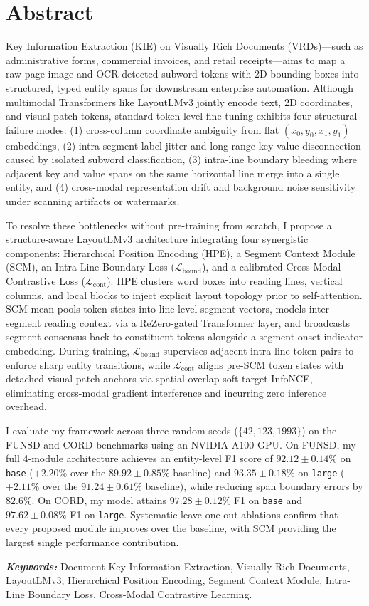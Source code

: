 \chapter*{Abstract}

Key Information Extraction (KIE) on Visually Rich Documents (VRDs)—such as administrative forms, commercial invoices, and retail receipts—aims to map a raw page image and OCR-detected subword tokens with 2D bounding boxes into structured, typed entity spans for downstream enterprise automation. Although multimodal Transformers like LayoutLMv3 jointly encode text, 2D coordinates, and visual patch tokens, standard token-level fine-tuning exhibits four structural failure modes: (1) cross-column coordinate ambiguity from flat $(x_0, y_0, x_1, y_1)$ embeddings, (2) intra-segment label jitter and long-range key-value disconnection caused by isolated subword classification, (3) intra-line boundary bleeding where adjacent key and value spans on the same horizontal line merge into a single entity, and (4) cross-modal representation drift and background noise sensitivity under scanning artifacts or watermarks.

To resolve these bottlenecks without pre-training from scratch, I propose a structure-aware LayoutLMv3 architecture integrating four synergistic components: Hierarchical Position Encoding (HPE), a Segment Context Module (SCM), an Intra-Line Boundary Loss ($\mathcal{L}_{\text{bound}}$), and a calibrated Cross-Modal Contrastive Loss ($\mathcal{L}_{\text{cont}}$). HPE clusters word boxes into reading lines, vertical columns, and local blocks to inject explicit layout topology prior to self-attention. SCM mean-pools token states into line-level segment vectors, models inter-segment reading context via a ReZero-gated Transformer layer, and broadcasts segment consensus back to constituent tokens alongside a segment-onset indicator embedding. During training, $\mathcal{L}_{\text{bound}}$ supervises adjacent intra-line token pairs to enforce sharp entity transitions, while $\mathcal{L}_{\text{cont}}$ aligns pre-SCM token states with detached visual patch anchors via spatial-overlap soft-target InfoNCE, eliminating cross-modal gradient interference and incurring zero inference overhead.

I evaluate my framework across three random seeds ($\{42, 123, 1993\}$) on the FUNSD and CORD benchmarks using an NVIDIA A100 GPU. On FUNSD, my full 4-module architecture achieves an entity-level F1 score of $92.12 \pm 0.14\%$ on \texttt{base} ($+2.20\%$ over the $89.92 \pm 0.85\%$ baseline) and $93.35 \pm 0.18\%$ on \texttt{large} ($+2.11\%$ over the $91.24 \pm 0.61\%$ baseline), while reducing span boundary errors by $82.6\%$. On CORD, my model attains $97.28 \pm 0.12\%$ F1 on \texttt{base} and $97.62 \pm 0.08\%$ F1 on \texttt{large}. Systematic leave-one-out ablations confirm that every proposed module improves over the baseline, with SCM providing the largest single performance contribution.

\vspace{0.5cm}
\textbf{\textit{Keywords:}} Document Key Information Extraction, Visually Rich Documents, LayoutLMv3, Hierarchical Position Encoding, Segment Context Module, Intra-Line Boundary Loss, Cross-Modal Contrastive Learning.
